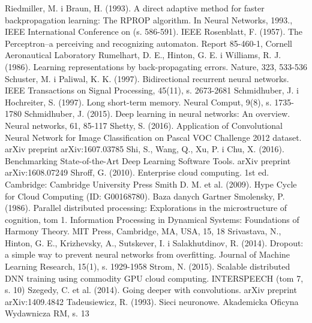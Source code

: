 \documentclass[12pt,a4paper,twoside]{article}
\begin{document}
\begin{thebibliography}{99}
 Riedmiller, M. i Braun, H. (1993). A direct adaptive method for faster backpropagation learning: The RPROP algorithm. In Neural Networks, 1993., IEEE International Conference on (s. 586-591). IEEE
 Rosenblatt, F. (1957). The Perceptron--a perceiving and recognizing automaton. Report 85-460-1, Cornell Aeronautical Laboratory
 Rumelhart, D. E., Hinton, G. E. i Williams, R. J. (1986). Learning representations by back-propagating errors. Nature, 323, 533-536
 Schuster, M. i Paliwal, K. K. (1997). Bidirectional recurrent neural networks. IEEE Transactions on Signal Processing, 45(11), s. 2673-2681
 Schmidhuber, J. i Hochreiter, S. (1997). Long short-term memory. Neural Comput, 9(8), s. 1735-1780
 Schmidhuber, J. (2015). Deep learning in neural networks: An overview. Neural networks, 61, 85-117
 Shetty, S. (2016).  Application of Convolutional Neural Network for Image Classification on Pascal VOC Challenge 2012 dataset. arXiv preprint arXiv:1607.03785
 Shi, S., Wang, Q., Xu, P. i Chu, X. (2016). Benchmarking State-of-the-Art Deep Learning Software Tools. arXiv preprint arXiv:1608.07249
 Shroff, G. (2010). Enterprise cloud computing. 1st ed. Cambridge: Cambridge University Press
 Smith D. M. et al. (2009). Hype Cycle for Cloud Computing (ID: G00168780). Baza danych Gartner
 Smolensky, P. (1986). Parallel distributed processing: Explorations in the microstructure of cognition, tom 1. Information Processing in Dynamical Systems: Foundations of Harmony Theory. MIT Press, Cambridge, MA, USA, 15, 18
 Srivastava, N., Hinton, G. E., Krizhevsky, A., Sutskever, I. i Salakhutdinov, R. (2014). Dropout: a simple way to prevent neural networks from overfitting. Journal of Machine Learning Research, 15(1), s. 1929-1958
 Strom, N. (2015). Scalable distributed DNN training using commodity GPU cloud computing. INTERSPEECH (tom 7, s. 10)
 Szegedy, C. et al. (2014). Going deeper with convolutions. arXiv preprint arXiv:1409.4842
 Tadeusiewicz, R. (1993). Sieci neuronowe. Akademicka Oficyna Wydawnicza RM, s. 13

\end{thebibliography}
\end{document}
